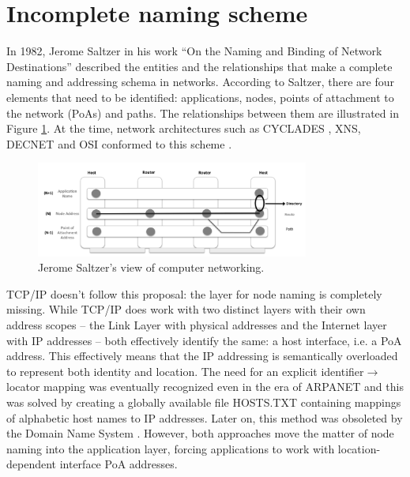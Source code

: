     \section{Incomplete naming scheme}

        In 1982, Jerome Saltzer in his work ``On the Naming and Binding of Network Destinations'' \cite{rfc1498} described the entities and the relationships that make a complete naming and addressing schema in networks. According to Saltzer, there are four elements that need to be identified: applications, nodes, points of attachment to the network (PoAs) and paths. The relationships between them are illustrated in Figure \ref{fig:saltzer}. At the time, network architectures such as CYCLADES \cite{Cyclades}, XNS, DECNET and OSI conformed to this scheme \cite{internet_demo}.

        \begin{figure}[H]
            \begin{center}
                \includegraphics[width=0.8\textwidth]{fig/problems_saltzer.png}
              \caption{Jerome Saltzer's view of computer networking.}
              \label{fig:saltzer}
            \end{center}
        \end{figure}

        TCP/IP doesn't follow this proposal: the layer for node naming is completely missing. While TCP/IP does work with two distinct layers with their own address scopes -- the Link Layer with physical addresses and the Internet layer with IP addresses -- both effectively identify the same: a host interface, i.e. a PoA address. This effectively means that the IP addressing is semantically overloaded to represent both identity and location. The need for an explicit identifier$\rightarrow$locator mapping was eventually recognized even in the era of ARPANET and this was solved by creating a globally available file HOSTS.TXT containing mappings of alphabetic host names to IP addresses. Later on, this method was obsoleted by the Domain Name System \cite{rfc1034}. However, both approaches move the matter of node naming into the application layer, forcing applications to work with location-dependent interface PoA addresses.

